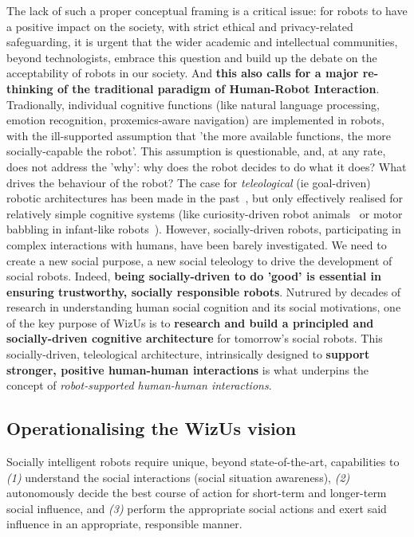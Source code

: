 \documentclass[11pt,a4paper]{report}
\newcommand{\project}{WizUs\xspace}
\begin{document}
The lack of such a proper conceptual framing is a critical issue: for robots to
have a positive impact on the society, with strict ethical and privacy-related
safeguarding, it is urgent that the wider academic and intellectual communities,
beyond technologists, embrace this question and build up the debate on the
acceptability of robots in our society. And \textbf{this also calls for a major
re-thinking of the traditional paradigm of Human-Robot Interaction}.
Tradionally, individual cognitive functions (like natural language processing,
emotion recognition, proxemics-aware navigation) are implemented in robots, with
the ill-supported assumption that 'the more available functions, the more
socially-capable the robot'. This assumption is questionable, and, at any rate,
does not address the 'why': why does the robot decides to do what it does? What
drives the behaviour of the robot? The case for \emph{teleological} (ie
goal-driven) robotic architectures has been made in the
past~\cite{wrede2012towards}, but only effectively realised for relatively
simple cognitive systems (like curiosity-driven robot
animals~\cite{oudeyer2005playground} or motor babbling in infant-like
robots~\cite{forestier2017unified}). However, socially-driven robots,
participating in complex interactions with humans, have been barely
investigated. We need to create a new social purpose, a new social teleology to
drive the development of social robots.  Indeed, \textbf{being socially-driven
to do 'good' is essential in ensuring trustworthy, socially responsible robots}.
Nutrured by decades of research in understanding human social cognition and its
social motivations, one of the key purpose of \project is to \textbf{research
and build a principled and socially-driven cognitive architecture} for
tomorrow's social robots. This socially-driven, teleological architecture,
intrinsically designed to \textbf{support stronger, positive human-human
interactions} is what underpins the concept of \emph{robot-supported human-human
interactions}.

\subsection{Operationalising the \project vision}

Socially intelligent robots require unique, beyond state-of-the-art,
capabilities to \emph{(1)} understand the social interactions (social
situation awareness), \emph{(2)} autonomously decide the best course of action for
short-term and longer-term social influence, and \emph{(3)} perform the
appropriate social actions and exert said influence in an appropriate,
responsible manner.
\end{document}
